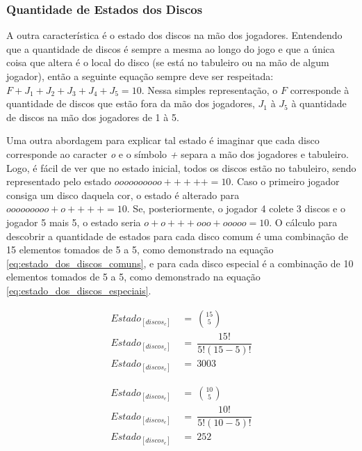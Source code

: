 \subsubsection{Quantidade de Estados dos Discos}

A outra característica é o estado dos discos na mão dos jogadores. Entendendo que a quantidade de discos é sempre a mesma ao longo do jogo e que a única coisa que altera é o local do disco (se está no tabuleiro ou na mão de algum jogador), então a seguinte equação sempre deve ser respeitada: $F+J_1+J_2+J_3+J_4+J_5 = 10$. Nessa simples representação, o $F$ corresponde à quantidade de discos que estão fora da mão dos jogadores, $J_1$ à $J_5$ à quantidade de discos na mão dos jogadores de 1 à 5.

Uma outra abordagem para explicar tal estado é imaginar que cada disco corresponde ao caracter \emph{o} e o símbolo \emph{+} separa a mão dos jogadores e tabuleiro. Logo, é fácil de ver que no estado inicial, todos os discos estão no tabuleiro, sendo representado pelo estado $oooooooooo+++++=10$. Caso o primeiro jogador consiga um disco daquela cor, o estado é alterado para $ooooooooo+o++++=10$. Se, posteriormente, o jogador 4 colete 3 discos e o jogador 5 mais 5, o estado seria $o+o+++ooo+ooooo=10$. O cálculo para descobrir a quantidade de estados para cada disco comum é uma combinação de 15 elementos tomados de 5 a 5, como demonstrado na equação \ref{eq:estado_dos_discos_comuns}, e para cada disco especial é a combinação de 10 elementos tomados de 5 a 5, como demonstrado na equação \ref{eq:estado_dos_discos_especiais}.

\begin{equation} \label{eq:estado_dos_discos_comuns} \tag{e.q. Estado dos discos comuns}
\begin{split}
	Estado_{[discos_c]}\ &=\ \binom{15}{5}\\
	Estado_{[discos_c]}\ &=\ \dfrac{15!}{5!(15-5)!}\\
	Estado_{[discos_c]}\ &=\ 3003
\end{split}
\end{equation}

\begin{equation} \label{eq:estado_dos_discos_especiais} \tag{e.q. Estado dos discos especiais}
\begin{split}
	Estado_{[discos_e]}\ &=\ \binom{10}{5}\\
	Estado_{[discos_e]}\ &=\ \dfrac{10!}{5!(10-5)!}\\
	Estado_{[discos_e]}\ &=\ 252
\end{split}
\end{equation}

